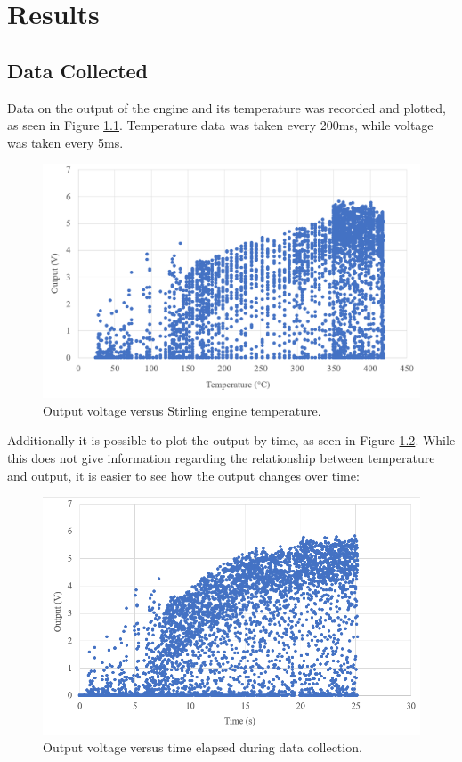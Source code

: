 \chapter{Results}

\section{Data Collected}

    Data on the output of the engine and its temperature was recorded and plotted, as seen in Figure \ref{fig:data3}. Temperature data was taken every 200ms, while voltage was taken every 5ms.
    
    \begin{figure}[ht]
        \centering
        \includegraphics[width=\textwidth]{diagrams/data3}
        \caption[Data]{Output voltage versus Stirling engine temperature.}
        \label{fig:data3}
    \end{figure}
    
    Additionally it is possible to plot the output by time, as seen in Figure \ref{fig:timedata}. While this does not give information regarding the relationship between temperature and output, it is easier to see how the output changes over time:
    
    \begin{figure}[ht]
        \centering
        \includegraphics[width=\textwidth]{diagrams/timedata}
        \caption[Time-dependent data]{Output voltage versus time elapsed during data collection.}
        \label{fig:timedata}
    \end{figure}

